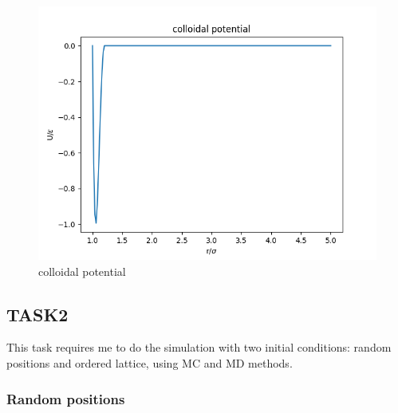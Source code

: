 \documentclass[letterpaper,12pt]{article}
\numberwithin{equation}{section}
\begin{document}
\begin{figure}[H]
    \centering
    \includegraphics[width=.8\textwidth]{phi_C.png}
    \caption{colloidal potential}
\end{figure}

\subsection{TASK2}
This task requires me to do the simulation with two initial conditions: random positions and ordered lattice, using MC and MD methods. 
\subsubsection{Random positions}
\end{document}
